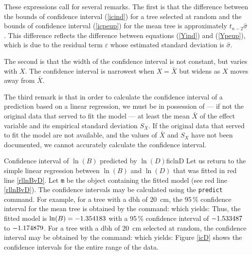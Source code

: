 These expressions call for several remarks. The first is that the difference between the bounds of confidence interval 
(\ref{icind}) for a tree selected at random and the bounds of confidence interval (\ref{icpeup}) for the mean tree is approximately $t_{n-2}\hat{\sigma}$. This difference reflects the difference between equations (\ref{Yind}) and (\ref{Ypeup}), which is due to the residual term $\varepsilon$ whose estimated standard deviation is $\hat{\sigma}$.

The second is that the width of the confidence interval is not constant, but varies with $X$. The confidence interval is narrowest when $X=\bar{X}$ but widens as $X$ moves away from $\bar{X}$.

The third remark is that in order to calculate the confidence interval of a prediction based on a linear regression, we must be in possession of --- if not the original data that served to fit the model --- at least the mean $\bar{X}$ of the effect variable and its empirical standard deviation $S_X$. If the original data that served to fit the model are not available, and the values of $\bar{X}$ and $S_X$ have not been documented, we cannot accurately calculate the confidence interval.

\begin{filrouge}{Confidence interval of $\ln(B)$ predicted by $\ln(D)$}{ficlnD}%
Let us return to the simple linear regression between $\ln(B)$ and $\ln(D)$
that was fitted in red line \ref{rllnBvD}. Let
\texttt{m} be the object containing the fitted model (see red line \ref{rllnBvD}). The confidence intervals may be calculated using the \texttt{predict} command. For example, for a tree with a dbh of 20~cm, the 95\,\% confidence interval for the mean tree is obtained by the command:
%
which yields:
%
Thus, the fitted model is $\ln(B)=-\mbox{1.354183}$ with a 95\,\% confidence interval of $-\mbox{1.533487}$
to $-\mbox{1.174879}$. For a tree with a dbh of 20~cm selected at random, the confidence interval may be obtained by the command:
%
which yields:
%
Figure \ref{icD} shows the confidence intervals for the entire range of the data.
\end{filrouge}

